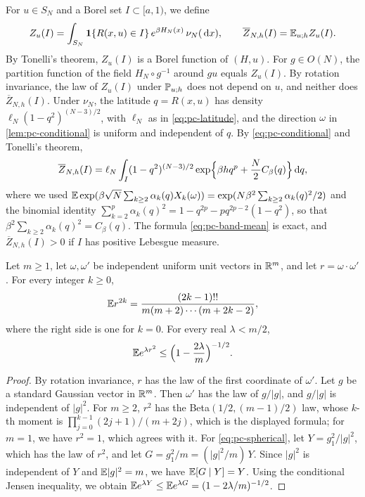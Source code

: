 For $u\in S_N$ and a Borel set $I\subset[a,1)$, we define
\[
Z_u(I)=\int_{S_N}\mathbf 1\{R(x,u)\in I\}\,e^{\beta H_N(x)}\,\nu_N(\,\mathrm d x),\qquad\overline Z_{N,h}(I)=\mathbb E_{u;h}Z_u(I).
\]
By Tonelli's theorem, $Z_u(I)$ is a Borel function of $(H,u)$. For $g\in O(N)$, the partition function of the field $H_N\circ g^{-1}$ around $gu$ equals $Z_u(I)$. By rotation invariance, the law of $Z_u(I)$ under $\mathbb P_{u;h}$ does not depend on $u$, and neither does $\overline Z_{N,h}(I)$. Under $\nu_N$, the latitude $q=R(x,u)$ has density $\ell_N(1-q^2)^{(N-3)/2}$, with $\ell_N$ as in \eqref{eq:pc-latitude}, and the direction $\omega$ in \cref{lem:pc-conditional} is uniform and independent of $q$. By \eqref{eq:pc-conditional} and Tonelli's theorem,
\begin{equation}\label{eq:pc-band-mean}
\overline Z_{N,h}(I)=\ell_N\int_I(1-q^2)^{(N-3)/2}\exp\Bigl\{\beta hq^p+\frac N2C_\beta(q)\Bigr\}\,\mathrm d q,
\end{equation}
where we used $\mathbb E\exp(\beta\sqrt N\sum_{k\ge2}\alpha_k(q)X_k(\omega))=\exp(N\beta^2\sum_{k\ge2}\alpha_k(q)^2/2)$ and the binomial identity $\sum_{k=2}^p\alpha_k(q)^2=1-q^{2p}-pq^{2p-2}(1-q^2)$, so that $\beta^2\sum_{k\ge2}\alpha_k(q)^2=C_\beta(q)$. The formula \eqref{eq:pc-band-mean} is exact, and $\overline Z_{N,h}(I)>0$ if $I$ has positive Lebesgue measure.

\begin{lemma}\label{lem:pc-spherical}
Let $m\ge1$, let $\omega,\omega'$ be independent uniform unit vectors in $\mathbb R^m$, and let $r=\omega\cdot\omega'$. For every integer $k\ge0$,
\[
\mathbb E r^{2k}=\frac{(2k-1)!!}{m(m+2)\cdots(m+2k-2)},
\]
where the right side is one for $k=0$. For every real $\lambda<m/2$,
\begin{equation}\label{eq:pc-spherical}
\mathbb E e^{\lambda r^2}\le\Bigl(1-\frac{2\lambda}m\Bigr)^{-1/2}.
\end{equation}
\end{lemma}

\begin{proof}
By rotation invariance, $r$ has the law of the first coordinate of $\omega'$. Let $g$ be a standard Gaussian vector in $\mathbb R^m$. Then $\omega'$ has the law of $g/|g|$, and $g/|g|$ is independent of $|g|^2$. For $m\ge2$, $r^2$ has the Beta$(1/2,(m-1)/2)$ law, whose $k$-th moment is $\prod_{j=0}^{k-1}(2j+1)/(m+2j)$, which is the displayed formula; for $m=1$, we have $r^2=1$, which agrees with it. For \eqref{eq:pc-spherical}, let $Y=g_1^2/|g|^2$, which has the law of $r^2$, and let $G=g_1^2/m=(|g|^2/m)\,Y$. Since $|g|^2$ is independent of $Y$ and $\mathbb E|g|^2=m$, we have $\mathbb E[G\mid Y]=Y$. Using the conditional Jensen inequality, we obtain $\mathbb E e^{\lambda Y}\le\mathbb E e^{\lambda G}=(1-2\lambda/m)^{-1/2}$.
\end{proof}

